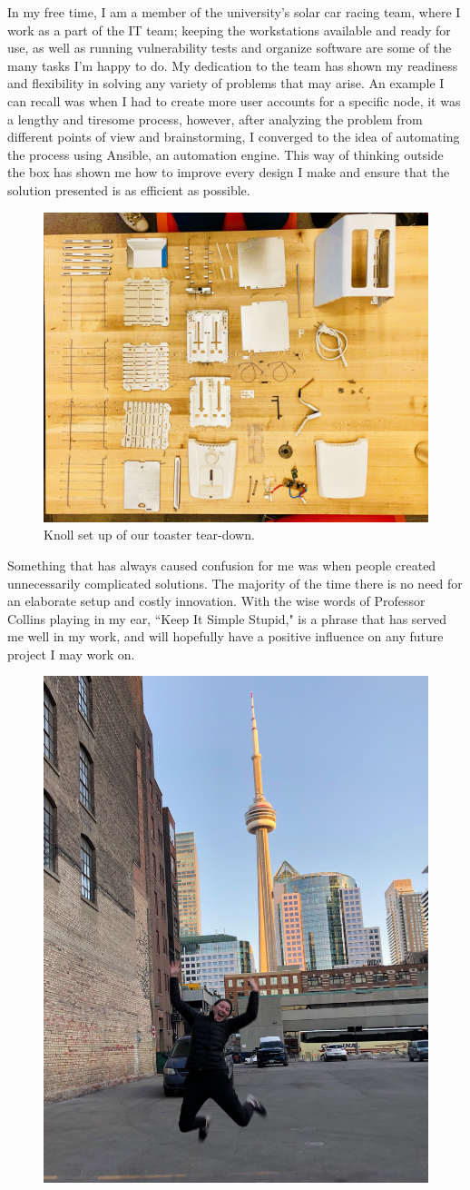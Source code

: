 \documentclass[paper=a4, fontsize=11pt]{article} %
\begin{document}
In my free time, I am a member of the university's solar car racing team, where I work as a part of the IT team; keeping the workstations available and ready for use, as well as running vulnerability tests and organize software are some of the many tasks I’m happy to do.  My dedication to the team has shown my readiness and flexibility in solving any variety of problems that may arise.  An example I can recall was when I had to create more user accounts for a specific node, it was a lengthy and tiresome process, however, after analyzing the problem from different points of view and brainstorming, I converged to the idea of automating the process using Ansible, an automation engine.  This way of thinking outside the box has shown me how to improve every design I make and ensure that the solution presented is as efficient as possible. 

\begin{figure}[H]
    \centering
    \includegraphics[width=0.5\linewidth]{toaster.jpeg}
    \caption{Knoll set up of our toaster tear-down.}
\end{figure}

Something that has always caused confusion for me was when people created unnecessarily complicated solutions.  The majority of the time there is no need for an elaborate setup and costly innovation.  With the wise words of Professor Collins playing in my ear, ``Keep It Simple Stupid," is a phrase that has served me well in my work, and will hopefully have a positive influence on any future project I may work on.  

\begin{figure}[H]
    \centering
    \includegraphics[width=0.5\linewidth]{jump.jpg}
\end{figure}
\end{document}

